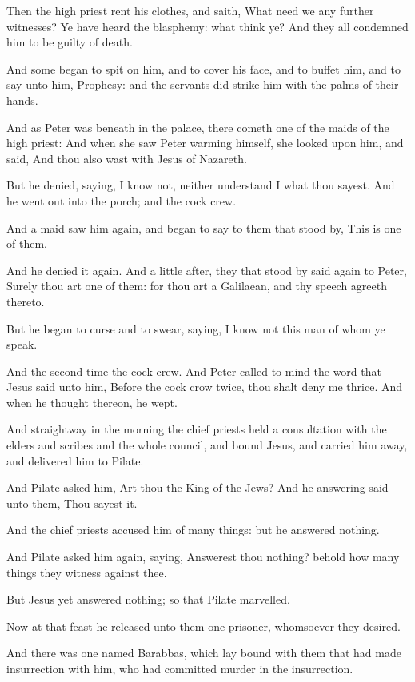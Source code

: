 \Verse Then the high priest rent his clothes, and saith, What need we any further witnesses?  \Verse Ye have heard the blasphemy: what think ye? And they all condemned him to be guilty of death.

\Verse And some began to spit on him, and to cover his face, and to buffet him, and to say unto him, Prophesy: and the servants did strike him with the palms of their hands.

\Verse And as Peter was beneath in the palace, there cometh one of the maids of the high priest: \Verse And when she saw Peter warming himself, she looked upon him, and said, And thou also wast with Jesus of Nazareth.

\Verse But he denied, saying, I know not, neither understand I what thou sayest. And he went out into the porch; and the cock crew.

\Verse And a maid saw him again, and began to say to them that stood by, This is one of them.

\Verse And he denied it again. And a little after, they that stood by said again to Peter, Surely thou art one of them: for thou art a Galilaean, and thy speech agreeth thereto.

\Verse But he began to curse and to swear, saying, I know not this man of whom ye speak.

\Verse And the second time the cock crew. And Peter called to mind the word that Jesus said unto him, Before the cock crow twice, thou shalt deny me thrice. And when he thought thereon, he wept.


\Chapter
\Verse And straightway in the morning the chief priests held a consultation with the elders and scribes and the whole council, and bound Jesus, and carried him away, and delivered him to Pilate.

\Verse And Pilate asked him, Art thou the King of the Jews? And he answering said unto them, Thou sayest it.

\Verse And the chief priests accused him of many things: but he answered nothing.

\Verse And Pilate asked him again, saying, Answerest thou nothing?  behold how many things they witness against thee.

\Verse But Jesus yet answered nothing; so that Pilate marvelled.

\Verse Now at that feast he released unto them one prisoner, whomsoever they desired.

\Verse And there was one named Barabbas, which lay bound with them that had made insurrection with him, who had committed murder in the insurrection.

